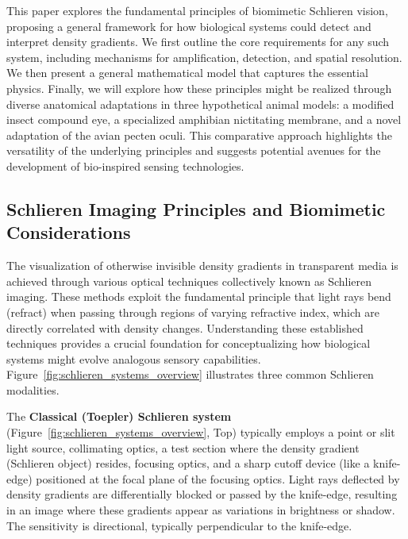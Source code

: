 \documentclass[11pt]{article}
\begin{document}
This paper explores the fundamental principles of biomimetic Schlieren vision, proposing a general framework for how biological systems could detect and interpret density gradients. We first outline the core requirements for any such system, including mechanisms for amplification, detection, and spatial resolution. We then present a general mathematical model that captures the essential physics. Finally, we will explore how these principles might be realized through diverse anatomical adaptations in three hypothetical animal models: a modified insect compound eye, a specialized amphibian nictitating membrane, and a novel adaptation of the avian pecten oculi. This comparative approach highlights the versatility of the underlying principles and suggests potential avenues for the development of bio-inspired sensing technologies.

\subsection{Schlieren Imaging Principles and Biomimetic Considerations}
\label{sec:schlieren_principles_biomimetic}

The visualization of otherwise invisible density gradients in transparent media is achieved through various optical techniques collectively known as Schlieren imaging. These methods exploit the fundamental principle that light rays bend (refract) when passing through regions of varying refractive index, which are directly correlated with density changes. Understanding these established techniques provides a crucial foundation for conceptualizing how biological systems might evolve analogous sensory capabilities. Figure~\ref{fig:schlieren_systems_overview} illustrates three common Schlieren modalities.

The \textbf{Classical (Toepler) Schlieren system} (Figure~\ref{fig:schlieren_systems_overview}, Top) typically employs a point or slit light source, collimating optics, a test section where the density gradient (Schlieren object) resides, focusing optics, and a sharp cutoff device (like a knife-edge) positioned at the focal plane of the focusing optics. Light rays deflected by density gradients are differentially blocked or passed by the knife-edge, resulting in an image where these gradients appear as variations in brightness or shadow. The sensitivity is directional, typically perpendicular to the knife-edge.
\end{document}
